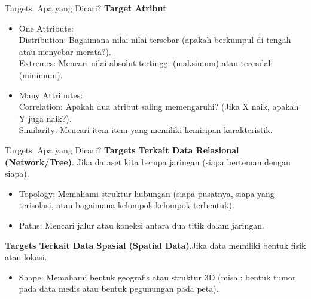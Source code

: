 \documentclass[t]{beamer}
\begin{document}
\begin{frame}{Targets: Apa yang Dicari?}
\textbf{Target Atribut}
\begin{itemize}
	\item One Attribute:\\
	Distribution: Bagaimana nilai-nilai tersebar (apakah berkumpul di tengah atau menyebar merata?).\\
	Extremes: Mencari nilai absolut tertinggi (maksimum) atau terendah (minimum).
	\item Many Attributes: \\
	Correlation: Apakah dua atribut saling memengaruhi? (Jika X naik, apakah Y juga naik?). \\
	Similarity: Mencari item-item yang memiliki kemiripan karakteristik. \\
\end{itemize}
\end{frame}

\begin{frame}{Targets: Apa yang Dicari?}
\textbf{Targets Terkait Data Relasional (Network/Tree)}. Jika dataset kita berupa jaringan (siapa berteman dengan siapa).
\begin{itemize}
	\item Topology: Memahami struktur hubungan (siapa pusatnya, siapa yang terisolasi, atau bagaimana kelompok-kelompok terbentuk).
	\item Paths: Mencari jalur atau koneksi antara dua titik dalam jaringan.
\end{itemize}

\textbf{Targets Terkait Data Spasial (Spatial Data)}.Jika data memiliki bentuk fisik atau lokasi.
\begin{itemize}
	\item Shape: Memahami bentuk geografis atau struktur 3D (misal: bentuk tumor pada data medis atau bentuk pegunungan pada peta).
\end{itemize}
\end{frame}
\end{document}
